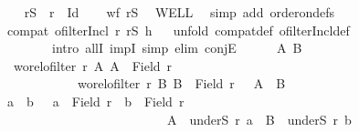 \begin{isabellebody}
\ \ \isamarkupfalse%
\ {\isacharquery}{\kern0pt}rS\ {\isacharequal}{\kern0pt}\ {\isachardoublequoteopen}r\ {\isacharminus}{\kern0pt}\ Id{\isachardoublequoteclose}\isanewline
\ \ \isamarkupfalse%
\ {\isachardoublequoteopen}wf\ {\isacharquery}{\kern0pt}rS{\isachardoublequoteclose}\ \isamarkupfalse%
\ WELL\ \isamarkupfalse%
\ {\isacharparenleft}{\kern0pt}simp\ add{\isacharcolon}{\kern0pt}\ order{\isacharunderscore}{\kern0pt}on{\isacharunderscore}{\kern0pt}defs{\isacharparenright}{\kern0pt}\isanewline
\ \ \isamarkupfalse%
\isanewline
\ \ \isamarkupfalse%
\ {\isachardoublequoteopen}compat\ {\isacharparenleft}{\kern0pt}ofilterIncl\ r{\isacharparenright}{\kern0pt}\ {\isacharquery}{\kern0pt}rS\ {\isacharquery}{\kern0pt}h{\isachardoublequoteclose}\isanewline
\ \ \isamarkupfalse%
{\isacharparenleft}{\kern0pt}unfold\ compat{\isacharunderscore}{\kern0pt}def\ ofilterIncl{\isacharunderscore}{\kern0pt}def{\isacharcomma}{\kern0pt}\isanewline
\ \ \ \ \ \ \ \ intro\ allI\ impI{\isacharcomma}{\kern0pt}\ simp{\isacharcomma}{\kern0pt}\ elim\ conjE{\isacharparenright}{\kern0pt}\isanewline
\ \ \ \ \isamarkupfalse%
\ A\ B\isanewline
\ \ \ \ \isamarkupfalse%
\ {\isacharasterisk}{\kern0pt}{\isacharcolon}{\kern0pt}\ {\isachardoublequoteopen}wo{\isacharunderscore}{\kern0pt}rel{\isachardot}{\kern0pt}ofilter\ r\ A{\isachardoublequoteclose}\ {\isachardoublequoteopen}A\ {\isasymnoteq}\ Field\ r{\isachardoublequoteclose}\ \isanewline
\ \ \ \ \ \ \ \ \ \ \ {\isacharasterisk}{\kern0pt}{\isacharasterisk}{\kern0pt}{\isacharcolon}{\kern0pt}\ {\isachardoublequoteopen}wo{\isacharunderscore}{\kern0pt}rel{\isachardot}{\kern0pt}ofilter\ r\ B{\isachardoublequoteclose}\ {\isachardoublequoteopen}B\ {\isasymnoteq}\ Field\ r{\isachardoublequoteclose}\ \ {\isacharasterisk}{\kern0pt}{\isacharasterisk}{\kern0pt}{\isacharasterisk}{\kern0pt}{\isacharcolon}{\kern0pt}\ {\isachardoublequoteopen}A\ {\isacharless}{\kern0pt}\ B{\isachardoublequoteclose}\isanewline
\ \ \ \ \isamarkupfalse%
\ \isamarkupfalse%
\ a\ \ b\ \ {}{\isacharcolon}{\kern0pt}\ {\isachardoublequoteopen}a\ {\isasymin}\ Field\ r\ {\isasymand}\ b\ {\isasymin}\ Field\ r{\isachardoublequoteclose}\ \isanewline
\ \ \ \ \ \ \ \ \ \ \ \ \ \ \ \ \ \ \ \ \ \ \ \ \ {}{\isacharcolon}{\kern0pt}\ {\isachardoublequoteopen}A\ {\isacharequal}{\kern0pt}\ underS\ r\ a\ {\isasymand}\ B\ {\isacharequal}{\kern0pt}\ underS\ r\ b{\isachardoublequoteclose}\isanewline

\end{isabellebody}
